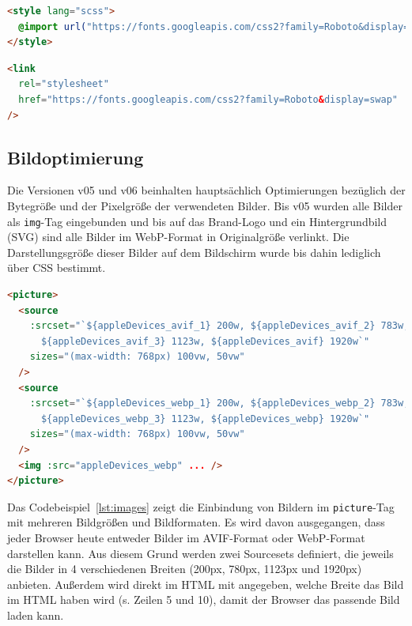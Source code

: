 \documentclass[11pt,a4paper]{article}
\begin{document}
\begin{lstlisting}[language=html, caption={Chained Request im Vue-Template}, label={lst:chained}]
<style lang="scss">
  @import url("https://fonts.googleapis.com/css2?family=Roboto&display=swap");
</style>
\end{lstlisting}
\begin{lstlisting}[language=html, caption={\enquote{Un-Chained} Request im HTML (index.html)}, label={lst:unchained}]
<link
  rel="stylesheet"
  href="https://fonts.googleapis.com/css2?family=Roboto&display=swap"
/>
\end{lstlisting}

\subsection{Bildoptimierung}\label{subsec:images}
Die Versionen v05 und v06 beinhalten hauptsächlich Optimierungen bezüglich der Bytegröße und der Pixelgröße der verwendeten Bilder.
Bis v05 wurden alle Bilder als \verb|img|-Tag eingebunden und bis auf das Brand-Logo und ein Hintergrundbild (SVG) sind alle Bilder im WebP-Format in Originalgröße verlinkt.
Die Darstellungsgröße dieser Bilder auf dem Bildschirm wurde bis dahin lediglich über CSS bestimmt.
\pagebreak

\begin{lstlisting}[language=html, caption={Einbindung von Bildern als picture-Tag}, label={lst:images}]
<picture>
  <source
    :srcset="`${appleDevices_avif_1} 200w, ${appleDevices_avif_2} 783w,
      ${appleDevices_avif_3} 1123w, ${appleDevices_avif} 1920w`"
    sizes="(max-width: 768px) 100vw, 50vw"
  />
  <source
    :srcset="`${appleDevices_webp_1} 200w, ${appleDevices_webp_2} 783w,
      ${appleDevices_webp_3} 1123w, ${appleDevices_webp} 1920w`"
    sizes="(max-width: 768px) 100vw, 50vw"
  />
  <img :src="appleDevices_webp" ... />
</picture>
\end{lstlisting}

Das Codebeispiel~\ref{lst:images} zeigt die Einbindung von Bildern im \verb|picture|-Tag mit mehreren Bildgrößen und Bildformaten.
Es wird davon ausgegangen, dass jeder Browser heute entweder Bilder im AVIF-Format oder WebP-Format darstellen kann.
Aus diesem Grund werden zwei Sourcesets definiert, die jeweils die Bilder in 4 verschiedenen Breiten (200px, 780px, 1123px und 1920px) anbieten.
Außerdem wird direkt im HTML mit angegeben, welche Breite das Bild im HTML haben wird (s. Zeilen 5 und 10), damit der Browser das passende Bild laden kann.
\end{document}
